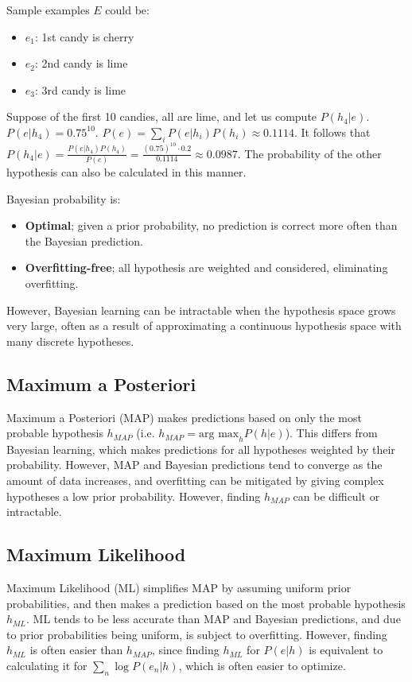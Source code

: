 \documentclass[12pt,titlepage]{article}
\begin{document}
      Sample examples $E$ could be:
      \begin{itemize}
        \item $e_1$: 1st candy is cherry
        \item $e_2$: 2nd candy is lime
        \item $e_3$: 3rd candy is lime
      \end{itemize}

      Suppose of the first 10 candies, all are lime, and let us compute $P(h_4|e)$. $P(e|h_4) = 0.75^{10}$. $P(e) = \sum_i P(e|h_i)P(h_i) \approx 0.1114$.
      It follows that $P(h_4|e) = \frac{P(e|h_4)P(h_4)}{P(e)} = \frac{(0.75)^{10} \cdot 0.2}{0.1114} \approx 0.0987$. The probability of the other hypothesis
      can also be calculated in this manner.

      Bayesian probability is:
      \begin{itemize}
        \item \textbf{Optimal}; given a prior probability, no prediction is correct more often than the Bayesian prediction.
        \item \textbf{Overfitting-free}; all hypothesis are weighted and considered, eliminating overfitting.
      \end{itemize}

      However, Bayesian learning can be intractable when the hypothesis space grows very large, often as a result of approximating a continuous hypothesis space
      with many discrete hypotheses.

    \subsection{Maximum a Posteriori}
      Maximum a Posteriori (MAP) makes predictions based on only the most probable hypothesis $h_{MAP}$ (i.e. $h_{MAP} = \text{arg max}_h P(h|e)$).
      This differs from Bayesian learning, which makes predictions for all hypotheses weighted by their probability. However, MAP and Bayesian predictions tend
      to converge as the amount of data increases, and overfitting can be mitigated by giving complex hypotheses a low prior probability. However, finding $h_{MAP}$
      can be difficult or intractable.

    \subsection{Maximum Likelihood}
      Maximum Likelihood (ML) simplifies MAP by assuming uniform prior probabilities, and then makes a prediction based on the most probable hypothesis $h_{ML}$.
      ML tends to be less accurate than MAP and Bayesian predictions, and due to prior probabilities being uniform, is subject to overfitting. However, finding
      $h_{ML}$ is often easier than $h_{MAP}$, since finding $h_{ML}$ for $P(e|h)$ is equivalent to calculating it for $\sum_n \log{P(e_n|h)}$, which is often
      easier to optimize.
\end{document}

